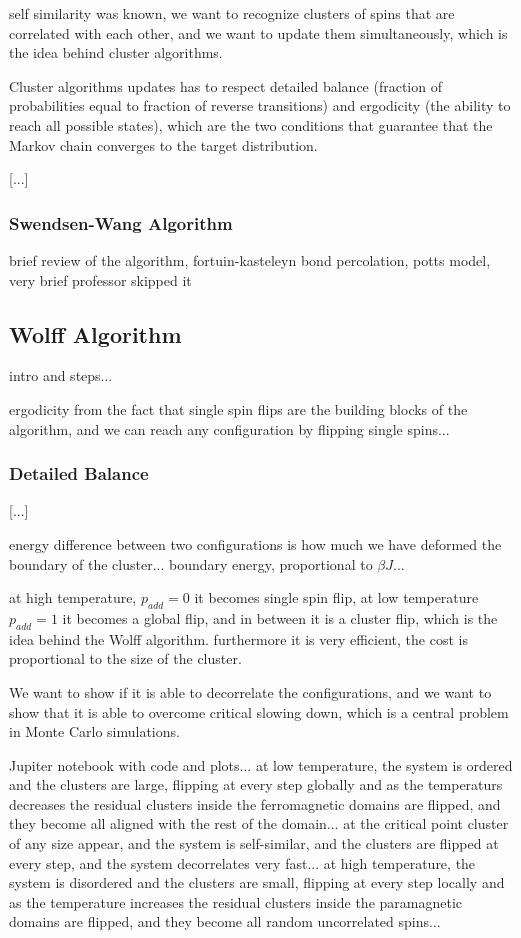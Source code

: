 self similarity was known, we want to recognize clusters of spins that are correlated with each other, and we want to update them simultaneously, which is the idea behind cluster algorithms.

Cluster algorithms updates has to respect detailed balance (fraction of probabilities equal to fraction of reverse transitions) and ergodicity (the ability to reach all possible states), which are the two conditions that guarantee that the Markov chain converges to the target distribution.

    [...]

\subsubsection{Swendsen-Wang Algorithm}

brief review of the algorithm, fortuin-kasteleyn bond percolation, potts model, very brief professor skipped it

\subsection{Wolff Algorithm}

intro and steps... 

ergodicity from the fact that single spin flips are the building blocks of the algorithm, and we can reach any configuration by flipping single spins...

\subsubsection{Detailed Balance}

[...]

energy difference between two configurations is how much we have deformed the boundary of the cluster... boundary energy, proportional to \(\beta J\)...

at high temperature, \(p_{add} =0\) it becomes single spin flip, at low temperature \(p_{add} = 1\) it becomes a global flip, and in between it is a cluster flip, which is the idea behind the Wolff algorithm. furthermore it is very efficient, the cost is proportional to the size of the cluster.

We want to show if it is able to decorrelate the configurations, and we want to show that it is able to overcome critical slowing down, which is a central problem in Monte Carlo simulations.

Jupiter notebook with code and plots... at low temperature, the system is ordered and the clusters are large, flipping at every step globally and as the temperaturs decreases the residual clusters inside the ferromagnetic domains are flipped, and they become all aligned with the rest of the domain... at the critical point cluster of any size appear, and the system is self-similar, and the clusters are flipped at every step, and the system decorrelates very fast... at high temperature, the system is disordered and the clusters are small, flipping at every step locally and as the temperature increases the residual clusters inside the paramagnetic domains are flipped, and they become all random uncorrelated spins...

